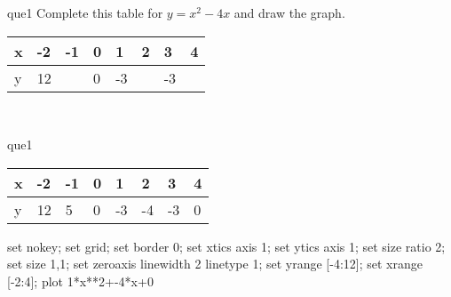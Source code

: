 \documentclass[13.5pt, varwidth=true]{beamer}
\begin{document}
\begin{frame}[shrink=19,fragile]
	\begin{beamercolorbox}[rounded=true, left, shadow=true,wd=14.8cm]{que1}
		 Complete this table for $y = x^{2} - 4x$ and draw the graph. \\[0.3cm] \renewcommand{\arraystretch}{1.2}\begin{tabular}{|C|C|C|C|C|C|C|C|} \hline x & -2 & -1 & 0 & 1 & 2 & 3 & 4 \\ \hline y & 12 &  & 0 & -3 &  & -3 & \\ \hline \end{tabular}\\[0.3cm]
	\end{beamercolorbox}
\end{frame}
\begin{frame}[shrink=19,fragile]
	\begin{beamercolorbox}[rounded=true, left, shadow=true,wd=14.8cm]{que1}
		\renewcommand{\arraystretch}{1.2}\begin{tabular}{|C|C|C|C|C|C|C|C|} \hline x & -2 & -1 & 0 & 1 & 2 & 3 & 4 \\ \hline y & 12 & 5 & 0 & -3 & -4 & -3 & 0\\ \hline \end{tabular}\begin{gnuplot}[terminal=pdf] set nokey; set grid; set border 0; set xtics axis 1; set ytics axis 1; set size ratio 2; set size 1,1; set zeroaxis linewidth 2 linetype 1; set yrange [-4:12]; set xrange [-2:4]; plot 1*x**2+-4*x+0 \end{gnuplot}
	\end{beamercolorbox}
\end{frame}
\end{document}
